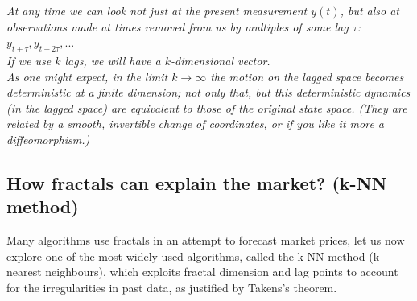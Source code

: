 \textit{At any time we can look not just at the present measurement $y(t)$, but also at observations made at times removed from us by multiples of some lag $\tau$: $y_{t+\tau},y_{t+2\tau},...$\\}
\textit{If we use $k$ lags, we will have a $k$-dimensional vector.\\}
\textit{As one might expect, in the limit $k \to \infty$ the motion on the lagged space becomes deterministic at a finite dimension; not only that, but this deterministic dynamics (in the lagged space) are equivalent to those of the original state space. (They are related by a smooth, invertible change of coordinates, or if you like it more a diffeomorphism.)}



\subsection{How fractals can explain the market? (k-NN method)}\label{sec:k-NN_method}
Many algorithms use fractals in an attempt to forecast market prices, let us now explore one of the most widely used algorithms, called the k-NN method (k-nearest neighbours), which exploits fractal dimension and lag points to account for the irregularities in past data, as justified by Takens's theorem.
